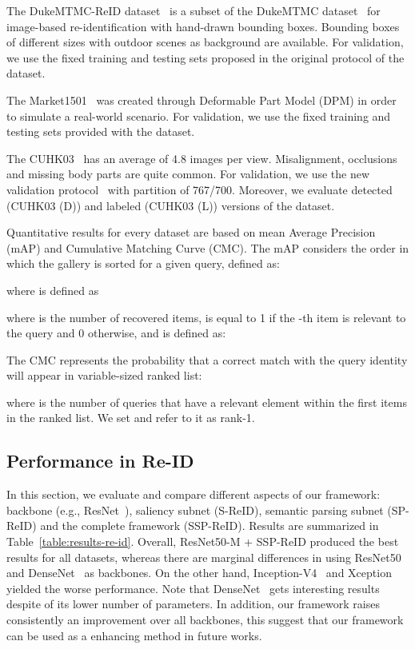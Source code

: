 \documentclass[final,3p,times,twocolumn]{elsarticle}
\begin{document}
The DukeMTMC-ReID dataset~\cite{zheng2017unlabeled} is a subset of the DukeMTMC dataset~\cite{ristani2016MTMC} for image-based re-identification with hand-drawn bounding boxes. Bounding boxes of different sizes with outdoor scenes as background are available. For validation, we use the fixed training and testing sets proposed in the original protocol of the dataset.

The Market1501~\cite{zheng2015scalable} was created through Deformable Part Model (DPM) in order to simulate a real-world scenario. For validation, we use the fixed training and testing sets provided with the dataset.

The CUHK03~\cite{li2014deepreid} has an average of 4.8 images per view. Misalignment, occlusions and missing body parts are quite common. For validation, we use the new validation protocol~\cite{zhong2017re} with partition of 767/700. Moreover, we evaluate detected (CUHK03 (D)) and labeled (CUHK03 (L)) versions of the dataset.

Quantitative results for every dataset are based on mean Average Precision (mAP) and Cumulative Matching Curve (CMC). The mAP considers the order in which the gallery is sorted for a given query, defined as:



\noindent where  is defined as



\noindent where  is the number of recovered items,  is equal to 1 if the -th item is relevant to the query and 0 otherwise, and  is defined as:



The CMC represents the probability that a correct match with the query identity will appear in variable-sized ranked list:



\noindent where  is the number of queries that have a relevant element within the first  items in the ranked list. We set  and refer to it as rank-1.

\subsection{Performance in Re-ID}

In this section, we evaluate and compare different aspects of our framework: backbone (e.g., ResNet~\cite{he2016deep}), saliency subnet (S-ReID), semantic parsing subnet (SP-ReID) and the complete framework (SSP-ReID). Results are summarized in Table~\ref{table:results-re-id}. Overall, ResNet50-M + SSP-ReID produced the best results for all datasets, whereas there are marginal differences in using ResNet50~\cite{he2016deep} and DenseNet~\cite{huang2017densely} as backbones. On the other hand, Inception-V4~\cite{szegedy2017inception} and Xception~\cite{chollet2016xception} yielded the worse performance. Note that DenseNet~\cite{huang2017densely} gets interesting results despite of its lower number of parameters. In addition, our framework raises consistently an improvement over all backbones, this suggest that our framework can be used as a enhancing method in future works.
\end{document}
